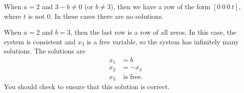 \begin{example}
\item When $a=2$ and $3-b \neq 0$ (or $b \neq 3$), then we have a row of the form $[0 \ 0 \ 0 \ t]$, where $t$ is not $0$. In these cases there are no solutions.
\item When $a=2$ and $b = 3$, then the last row is a row of all zeros. In this case, the system is consistent and $x_3$ is a free variable, so the system has infinitely many solutions. The solutions are 
\begin{align*}
x_1 &= b \\
x_2 &= -x_3 \\
x_3 &\text{ is free.}
\end{align*}
You should check to ensure that this solution is correct.
\ea

 \end{example}

\label{sec:row_ech_summ}

